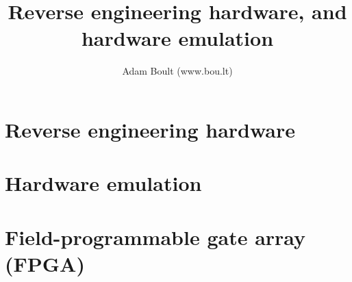 \documentclass[oneside]{book}
\begin{document}
\author{Adam Boult (www.bou.lt)}
\title{Reverse engineering hardware, and hardware emulation}
\maketitle

\setcounter{tocdepth}{0}
\tableofcontents



\part{Reverse engineering hardware}

\part{Hardware emulation}


\part{Field-programmable gate array (FPGA)}
\end{document}
